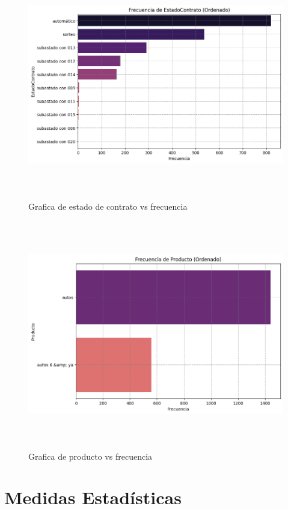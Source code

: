 \begin{figure}[H]
    \centering
       \includegraphics[width=14cm, height=10cm ]{Imagenes/EstadoContrato.png}
      \caption{Grafica de estado de contrato  vs frecuencia}
      \label{fig:Edocontra}
\end{figure}
\begin{figure}[H]
    \centering
       \includegraphics[width=14cm, height=10cm ]{Imagenes/Producto.png}
      \caption{Grafica de producto  vs frecuencia}
      \label{fig:ProductoF}
\end{figure}

\section{Medidas Estadísticas}

